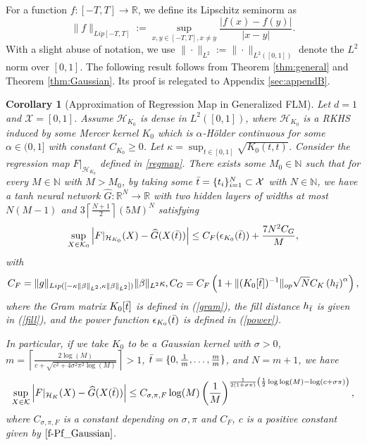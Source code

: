 \documentclass{article}
\def\NN{\mathbb N}
\def\RR{\mathbb R}
\numberwithin{equation}{section}
\newtheorem{corollary}[theorem]{Corollary}
\begin{document}
For a function $f:[-T, T] \to \RR$, we define its Lipschitz seminorm as $$\|f\|_{Lip[-T,T]}:= \sup_{x,y\in [-T, T], x \neq y}\frac{|f(x) - f(y)|}{|x-y|}.$$
 With a slight abuse of notation, we use $\|\cdot\|_{L^2}:= \|\cdot\|_{L^2([0,1])}$ denote the $L^2$ norm over $[0,1]$.
The following result follows from Theorem \ref{thm:general} and Theorem \ref{thm:Gaussian}.
Its proof is relegated to Appendix \ref{sec:appendB}. 
\begin{corollary}[Approximation of Regression Map in Generalized FLM] \label{corollary:FLM}
Let $d=1$ and $\mathcal{X} = [0,1]$.
Assume $\mathcal{H}_{K_0} $ is dense in $L^2([0,1])$, where $\mathcal{H}_{K_0}$ is a RKHS induced by some Mercer kernel $K_0$ which is $\alpha$-H\"{o}lder continuous for some $\alpha \in (0, 1]$ with constant $C_{K_0} \geq 0$.  
Let $\kappa=\sup_{t\in[0,1]}\sqrt{K_0(t,t)}$. 
Consider the regression map $F|_{\mathcal{H}_{K_0}}$ defined in \eqref{regmap}.
 There exists some $M_0\in \NN$ such that for every $M\in \NN$ with $M>M_0$, by taking some
    $\Bar{t}=\{t_i\}_{i=1}^N \subset \mathcal{X}$ with $N\in \NN$, we have a tanh neural network $\widehat{G}: \RR^N \to \RR$ with two hidden layers of widths at most $N(M-1)$ and $3\left\lceil\frac{N+1}{2}\right\rceil (5M)^N$ satisfying 
\begin{equation}\label{thm:general_bound}
    \sup_{X\in \mathcal{K}_0}\left|F|_{\mathcal{H}_{K_0}}(X) - \widehat{G}(X(\Bar{t}))\right|\leq  C_F (\epsilon_{K_0}(\Bar{t})) + \frac{7N^2C_G}{M},
\end{equation}
with $$C_F= \|g\|_{Lip([-\kappa \|\beta\|_{L^2}, \kappa \|\beta\|_{L^2}])} \|\beta\|_{L^2}\kappa, C_G = C_F\left(1+ \|(K_0[\Bar{t}])^{-1 }\|_{op}\sqrt{N} C_K \left(h_{\Bar{t}}\right)^\alpha\right),$$ 
where the Gram matrix $K_0[\Bar{t}]$ is defined in (\ref{gram}), the fill distance $h_{\Bar{t}}$ is given in (\ref{fill}), and the power function $\epsilon_{K_0}(\Bar{t})$ is defined in (\ref{power}).

In particular, if we take $K_0$ to be a Gaussian kernel with $\sigma >0$,  
        $m = \left\lceil \frac{2 \log(M)}{c + \sqrt{c^2+4\sigma^2\pi^2 \log(M)}}\right \rceil > 1$,
$\Bar{t}=\{0, \frac{1}{m},\ldots, \frac{m}{m}\}$, and $N= m+1$, we have 
\begin{equation}
    \sup_{X\in \mathcal{K}}\left|F|_{\mathcal{H}_K}(X) - \widehat{G}(X(\Bar{t}))\right|\leq C_{\sigma, \pi, F} \log (M)\left(\frac{1}{M}\right)^{\frac{1}{2(1+ \sigma \pi )}
    \left(\frac{1}{2}\log\log(M) - \log(c+ \sigma \pi)\right)},
\end{equation}
where $C_{\sigma, \pi, F}$ is a constant depending on $\sigma, \pi$ and $C_F$, $c$ is a positive constant given by $\eqref{f-Pf_Gaussian}$. 
\end{corollary}
\end{document}
